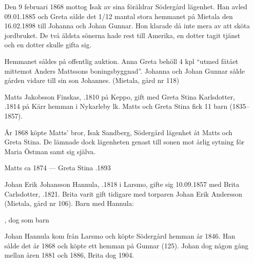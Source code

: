 Den 9 februari 1868 mottog Isak av sina föräldrar Södergård lägenhet. Han avled 09.01.1885 och Greta sålde det 1/12 mantal stora hemmanet på Mietala den 16.02.1898 till Johanna och Johan Gunnar. Hon klarade då inte mera av att sköta jordbruket. De två äldsta sönerna hade rest till Amerika, en dotter tagit tjänst och en dotter skulle gifta sig.

Hemmanet såldes på offentlig auktion. Anna Greta behöll 4 kpl ``utmed fätået mittemot Anders Mattssons boningsbyggnad''. Johanna och Johan Gunnar sålde gården vidare till sin son Johannes. (Mietala, gård nr 118)


%
Matts Jakobsson Finskas, .1810 på Keppo, gift med Greta Stina Karlsdotter,  .1814 på Kärr hemman i Nykarleby lk. Matts och Greta Stina fick 11 barn (1835--1857).

År 1868 köpte Matts' bror, Isak Sandberg, Södergård lägenhet åt Matts och Greta Stina. De lämnade dock lägenheten genast till sonen  mot årlig sytning för Maria Östman samt sig själva.

Matts \textdied ca 1874  ---  Greta Stina .1893


%
Johan Erik Johansson Hannula, .1818 i Larsmo, gifte sig 10.09.1857 med Brita Carlsdotter, .1821. Brita varit gift tidigare med torparen Johan Erik Andersson (Mietala, gård nr 106). Barn med Hannula:
\begin{jhchildren}
  \item {}
  \item {}
  \item {}, dog som barn
  \item {}
\end{jhchildren}

Johan Hannula kom från Larsmo och köpte Södergård hemman år 1846. Han sålde det år 1868 och köpte ett hemman på Gunnar (125). Johan dog någon gång mellan åren 1881 och 1886, Brita dog 1904.



